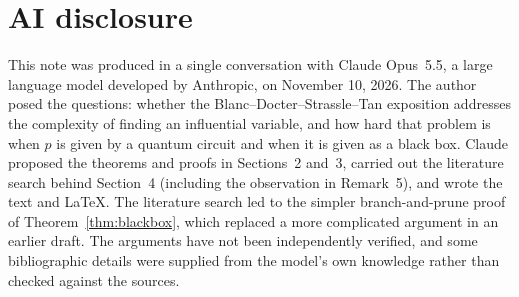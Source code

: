 \documentclass[11pt]{article}
\theoremstyle{remark}
\begin{document}
\section*{AI disclosure}

This note was produced in a single conversation with Claude Opus~5.5, a large language
model developed by Anthropic, on November 10, 2026. The author posed the questions: whether
the Blanc--Docter--Strassle--Tan exposition addresses the complexity of finding an
influential variable, and how hard that problem is when $p$ is given by a quantum circuit
and when it is given as a black box. Claude proposed the theorems and proofs in
Sections~2 and~3, carried out the literature search behind Section~4 (including the
observation in Remark~5), and wrote the text and \LaTeX. The literature search led to the
simpler branch-and-prune proof of Theorem~\ref{thm:blackbox}, which replaced a more
complicated argument in an earlier draft. The arguments have not been independently
verified, and some bibliographic details were supplied from the model's own knowledge
rather than checked against the sources.
\end{document}
